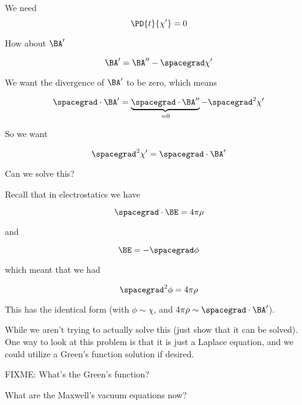 We need 
\begin{equation}\label{eqn:relativisticElectrodynamicsL14:170}
\PD{t}{\chi'} = 0
\end{equation}

How about $\BA'$

\begin{equation}\label{eqn:relativisticElectrodynamicsL14:190}
\BA' = \BA'' - \spacegrad \chi'
\end{equation}

We want the divergence of $\BA'$ to be zero, which means

\begin{equation}\label{eqn:relativisticElectrodynamicsL14:210}
\spacegrad \cdot \BA' = \underbrace{\spacegrad \cdot \BA''}_{=0} - \spacegrad^2 \chi'
\end{equation}

So we want

\begin{equation}\label{eqn:relativisticElectrodynamicsL14:230}
\spacegrad^2 \chi' = \spacegrad \cdot \BA'
\end{equation}

Can we solve this?

Recall that in electrostatics we have

\begin{equation}\label{eqn:relativisticElectrodynamicsL14:250}
\spacegrad \cdot \BE = 4 \pi \rho
\end{equation}

and 

\begin{equation}\label{eqn:relativisticElectrodynamicsL14:270}
\BE = -\spacegrad \phi
\end{equation}

which meant that we had 

\begin{equation}\label{eqn:relativisticElectrodynamicsL14:290}
\spacegrad^2 \phi = 4 \pi \rho
\end{equation}

This has the identical form (with $\phi \sim \chi$, and $4 \pi \rho \sim \spacegrad \cdot \BA'$).

While we aren't trying to actually solve this (just show that it can be solved).  One way to look at this problem is that it is just a Laplace equation, and we could utilize a Green's function solution if desired.

FIXME: What's the Green's function?

What are the Maxwell's vacuum equations now?

